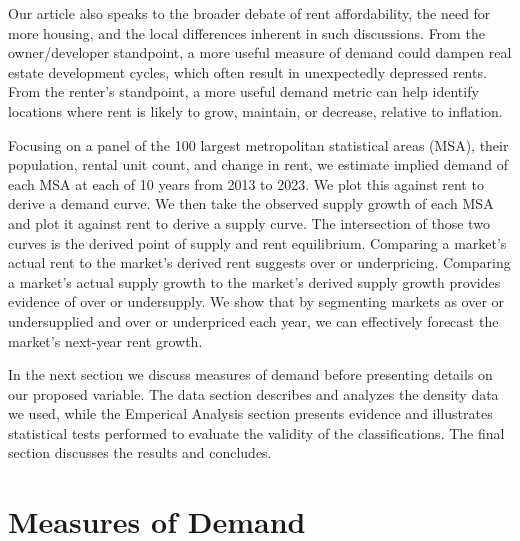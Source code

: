 \documentclass[sn-mathphys-num]{sn-jnl}%
\theoremstyle{thmstyleone}%
\theoremstyle{thmstyletwo}%
\theoremstyle{thmstylethree}%
\begin{document}
Our article also speaks to the broader debate of rent affordability, the need for more housing, and the local differences inherent in such discussions. From the owner/developer standpoint, a more useful measure of demand could dampen real estate development cycles, which often result in unexpectedly depressed rents. From the renter's standpoint, a more useful demand metric can help identify locations where rent is likely to grow, maintain, or decrease, relative to inflation.  

Focusing on a panel of the 100 largest metropolitan statistical areas (MSA), their population, rental unit count, and change in rent, we estimate implied demand of each MSA at each of 10 years from 2013 to 2023. We plot this against rent to derive a demand curve. We then take the observed supply growth of each MSA and plot it against rent to derive a supply curve. The intersection of those two curves is the derived point of supply and rent equilibrium. Comparing a market's actual rent to the market's derived rent suggests over or underpricing. Comparing a market's actual supply growth to the market's derived supply growth provides evidence of over or undersupply. We show that by segmenting markets as over or undersupplied and over or underpriced each year, we can effectively forecast the market's next-year rent growth.  

In the next section we discuss measures of demand before presenting details on our proposed variable. The data section describes and analyzes the density data we used, while the Emperical Analysis section presents evidence and illustrates statistical tests performed to evaluate the validity of the classifications. The final section discusses the results and concludes. 
 
\section{Measures of Demand}
\end{document}
